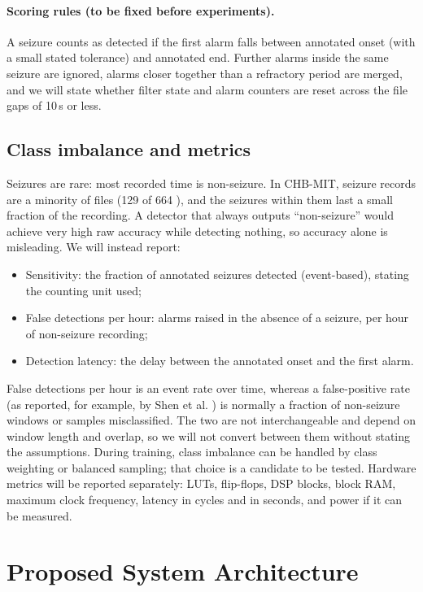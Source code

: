 \documentclass[10pt,twocolumn,letterpaper]{article}
\begin{document}
\paragraph{Scoring rules (to be fixed before experiments).} A seizure
counts as detected if the first alarm falls between annotated onset
(with a small stated tolerance) and annotated end. Further alarms inside
the same seizure are ignored, alarms closer together than a refractory
period are merged, and we will state whether filter state and alarm
counters are reset across the file gaps of 10\,s or less.

\subsection{Class imbalance and metrics}

Seizures are rare: most recorded time is non-seizure. In CHB-MIT,
seizure records are a minority of files (129 of 664
\cite{guttag2010chbmit}), and the seizures within them last a small
fraction of the recording. A detector that always outputs
``non-seizure'' would achieve very high raw accuracy while detecting
nothing, so accuracy alone is misleading. We will instead report:
\begin{itemize}
  \item Sensitivity: the fraction of annotated seizures detected
    (event-based), stating the counting unit used;
  \item False detections per hour: alarms raised in the absence of a
    seizure, per hour of non-seizure recording;
  \item Detection latency: the delay between the annotated onset and the
    first alarm.
\end{itemize}
False detections per hour is an event rate over time, whereas a
false-positive rate (as reported, for example, by Shen et al.
\cite{shen2022dwt}) is normally a fraction of non-seizure windows or
samples misclassified. The two are not interchangeable and depend on
window length and overlap, so we will not convert between them without
stating the assumptions. During training, class imbalance can be handled
by class weighting or balanced sampling; that choice is a candidate to
be tested. Hardware metrics will be reported separately: LUTs,
flip-flops, DSP blocks, block RAM, maximum clock frequency, latency in
cycles and in seconds, and power if it can be measured.

\section{Proposed System Architecture}
\label{sec:arch}
\end{document}

